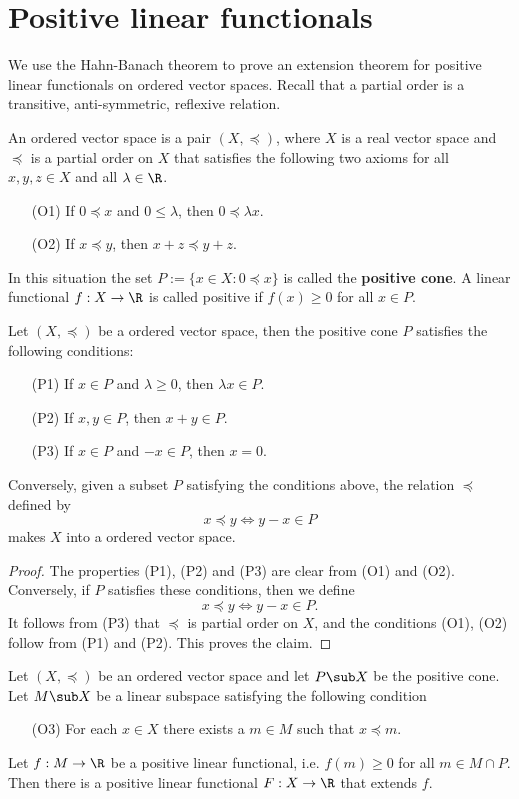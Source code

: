 \section{Positive linear functionals}
We use the Hahn-Banach theorem to prove an extension theorem for positive linear functionals on ordered vector spaces. Recall that a partial order is a transitive, anti-symmetric, reflexive relation.
\begin{definition}
An ordered vector space is a pair $(X,\preceq)$, where $X$ is a real vector space and $\preceq$ is a partial order on $X$ that satisfies the following two axioms for all $x,y,z\in X$ and all $\lambda\in\R$.
\begin{itemize}
\item[(O1)] If $0\preceq x$ and $0\leq\lambda$, then $0\preceq\lambda x$. 
\item[(O2)] If $x\preceq y$, then $x+z\preceq y+z$.
\end{itemize}
In this situation the set $P:=\{x\in X:0\preceq x\}$ is called the \textbf{positive cone}. A linear functional $f:X\to\R$ is called positive if $f(x)\geq 0$ for all $x\in P$.
\end{definition}
\begin{proposition}\label{ordered vector space char by cone}
Let $(X,\preceq)$ be a ordered vector space, then the positive cone $P$ satisfies the following conditions:
\begin{itemize}
\item[(P1)] If $x\in P$ and $\lambda\geq 0$, then $\lambda x\in P$.
\item[(P2)] If $x,y\in P$, then $x+y\in P$.
\item[(P3)] If $x\in P$ and $-x\in P$, then $x=0$.
\end{itemize}
Conversely, given a subset $P$ satisfying the conditions above, the relation $\preceq$ defined by
\[x\preceq y\iff y-x\in P\]
makes $X$ into a ordered vector space.
\end{proposition}
\begin{proof}
The properties (P1), (P2) and (P3) are clear from (O1) and (O2). Conversely, if $P$ satisfies these conditions, then we define
\[x\preceq y\iff y-x\in P.\]
It follows from (P3) that $\preceq$ is partial order on $X$, and the conditions (O1), (O2) follow from (P1) and (P2). This proves the claim.
\end{proof}
\begin{theorem}\label{Hahn-Banach theorem for positive linear functional}
Let $(X,\preceq)$ be an ordered vector space and let $P\sub X$ be the positive cone. Let $M\sub X$ be a linear subspace satisfying the following condition
\begin{itemize}
\item[(O3)] For each $x\in X$ there exists a $m\in M$ such that $x\preceq m$.
\end{itemize}
Let $f:M\to\R$ be a positive linear functional, i.e. $f(m)\geq 0$ for all $m\in M\cap P$. Then there is a positive linear functional $F:X\to\R$ that extends $f$.
\end{theorem}
